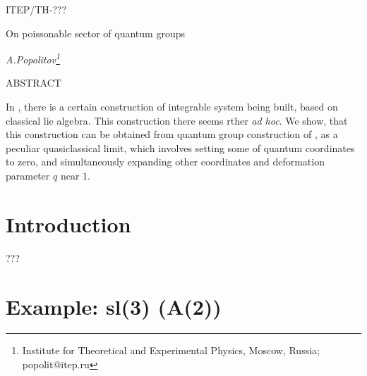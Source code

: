 \documentclass{paper}
\begin{document}
\thispagestyle{empty}

\baselineskip14pt

\hfill ITEP/TH-???

\bigskip

\bigskip

\centerline{\LARGE{On poissonable sector of quantum groups
}}

\vspace{5ex}

\centerline{\large{\emph{A.Popolitov\footnote{Institute for Theoretical and Experimental Physics, Moscow, Russia; popolit@itep.ru}}}}

\vspace{4ex}

\centerline{ABSTRACT}

\bigskip

{\footnotesize
In \cite{Mars},\cite{FG} there is a certain construction of integrable system being built, based on
classical lie algebra. This construction there seems rther {\it ad hoc}. We show, that this
construction can be obtained from quantum group construction of \cite{MV}, as a peculiar quasiclassical limit,
which involves setting some of quantum coordinates to zero, and simultaneously expanding other coordinates
and deformation parameter $q$ near $1$.
}

\section{Introduction}

???


\section{Example: sl(3) (A(2))}
\end{document}
